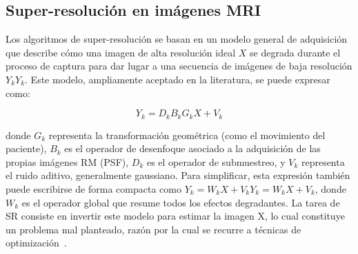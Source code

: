 \documentclass[../main.tex]{subfiles}
\begin{document}


\subsection{Super-resolución en imágenes MRI}
Los algoritmos de super-resolución se basan en un modelo general de adquisición que describe cómo una imagen de alta resolución ideal $X$ se degrada durante el proceso de captura para dar lugar a una secuencia de imágenes de baja resolución $Y_kY_k$. Este modelo, ampliamente aceptado en la literatura, se puede expresar como:

\begin{equation}
    Y_k=D_kB_kG_kX+V_k
\end{equation}

donde $G_k$ representa la transformación geométrica (como el movimiento del paciente), $B_k$ es el operador de desenfoque asociado a la adquisición de las propias imágenes RM (PSF), $D_k$ es el operador de submuestreo, y $V_k$ representa el ruido aditivo, generalmente gaussiano. Para simplificar, esta expresión también puede escribirse de forma compacta como $Y_k=W_kX+V_kY_k = W_kX+V_k$, donde $W_k$ es el operador global que resume todos los efectos degradantes. La tarea de SR consiste en invertir este modelo para estimar la imagen X, lo cual constituye un problema mal planteado, razón por la cual se recurre a técnicas de optimización~\cite{sr_systematic_r}.
\end{document}
